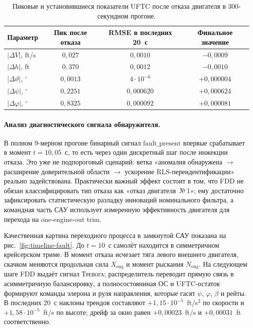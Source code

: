 \documentclass[a4paper,14pt]{extarticle}
\newcommand{\UFTC}{\textsc{UFTC}}
\newcommand{\FDD}{\textsc{FDD}}
\newcommand{\RLS}{\textsc{RLS}}
\newcommand{\degr}{^{\circ}}
\begin{document}
\begin{table}[H]
\centering
\small
\caption{Пиковые и установившиеся показатели \UFTC{} после отказа двигателя в 300-секундном прогоне.}
\label{tab:uftc-rates}
\begin{tabularx}{\linewidth}{l c c c}
\toprule
Параметр & Пик после отказа & RMSE в последних 20~с & Финальное значение \\
\midrule
$|\Delta V|$, ft/s & $0{,}027$ & $0{,}0010$ & $-0{,}0009$ \\
$|\Delta h|$, ft & $0{,}370$ & $0{,}0012$ & $-0{,}0010$ \\
$|\Delta\vartheta|$, $\degr$ & $0{,}0013$ & $4\cdot10^{-6}$ & $+0{,}000004$ \\
$|\Delta\psi|$, $\degr$ & $0{,}2251$ & $0{,}000620$ & $+0{,}000624$ \\
$|\Delta\varphi|$, $\degr$ & $0{,}8325$ & $0{,}000092$ & $+0{,}000081$ \\
\bottomrule
\end{tabularx}
\end{table}

\paragraph{Анализ диагностического сигнала обнаружителя.} В полном 9-мерном прогоне бинарный сигнал $\text{fault\_present}$ впервые срабатывает в момент $t=10{,}05$~с, то есть через один дискретный шаг после инжекции отказа. Это уже не подпороговый сценарий: ветка «аномалия обнаружена $\to$ расширение доверительной области $\to$ ускорение \RLS{}-переидентификации» реально задействована. Практически важный эффект состоит в том, что \FDD{} не обязан классифицировать тип отказа как «отказ двигателя~№\,1»; ему достаточно зафиксировать статистическую разладку инноваций номинального фильтра, а командная часть САУ использует измеренную эффективность двигателя для перехода на one-engine-out trim.

Качественная картина переходного процесса в замкнутой САУ показана на рис.~\ref{fig:timeline-fault}. До $t=10$~с самолёт находится в симметричном крейсерском триме. В момент отказа исчезает тяга левого внешнего двигателя, скачком меняются продольная сила $X_{\text{eng}}$ и момент рыскания $N_{\text{eng}}$. На следующем шаге \FDD{} выдаёт сигнал \textsc{Тревога}; распределитель переводит прямую связь в асимметричную балансировку, а полносостояниная ОС и \UFTC{}-остаток формируют команды элерона и руля направления, которые гасят $\psi$, $\varphi$, $\beta$ и рейты. В последних 20~с наклоны трендов составляют $+1{,}15\cdot10^{-5}$~ft/s$^2$ по скорости и $+1{,}58\cdot10^{-5}$~ft/s по высоте; дрейф за окно равен $+0{,}00023$~ft/s и $+0{,}00031$~ft соответственно.
\end{document}
